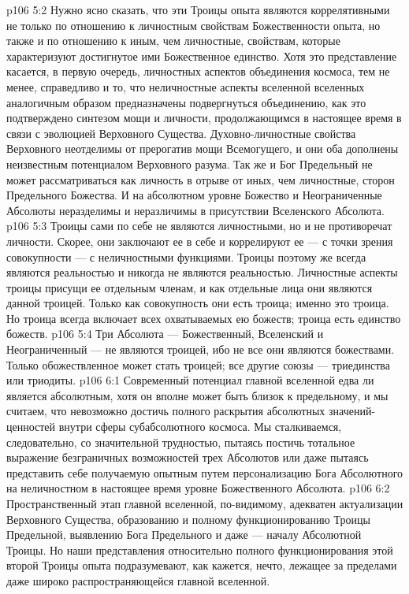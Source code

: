 \vs p106 5:2 Нужно ясно сказать, что эти Троицы опыта являются коррелятивными не только по отношению к личностным свойствам Божественности опыта, но также и по отношению к иным, чем личностные, свойствам, которые характеризуют достигнутое ими Божественное единство. Хотя это представление касается, в первую очередь, личностных аспектов объединения космоса, тем не менее, справедливо и то, что неличностные аспекты вселенной вселенных аналогичным образом предназначены подвергнуться объединению, как это подтверждено синтезом мощи и личности, продолжающимся в настоящее время в связи с эволюцией Верховного Существа. Духовно\hyp{}личностные свойства Верховного неотделимы от прерогатив мощи Всемогущего, и они оба дополнены неизвестным потенциалом Верховного разума. Так же и Бог Предельный не может рассматриваться как личность в отрыве от иных, чем личностные, сторон Предельного Божества. И на абсолютном уровне Божество и Неограниченные Абсолюты неразделимы и неразличимы в присутствии Вселенского Абсолюта.
\vs p106 5:3 Троицы сами по себе не являются личностными, но и не противоречат личности. Скорее, они заключают ее в себе и коррелируют ее --- с точки зрения совокупности --- с неличностными функциями. Троицы поэтому же всегда являются  реальностью и никогда не являются  реальностью. Личностные аспекты троицы присущи ее отдельным членам, и как отдельные лица они  являются данной троицей. Только как совокупность они есть троица; именно это  троица. Но троица всегда включает всех охватываемых ею божеств; троица есть единство божеств.
\vs p106 5:4 Три Абсолюта --- Божественный, Вселенский и Неограниченный --- не являются троицей, ибо не все они являются божествами. Только обожествленное может стать троицей; все другие союзы --- триединства или триодиты.
\vs p106 6:1 Современный потенциал главной вселенной едва ли является абсолютным, хотя он вполне может быть близок к предельному, и мы считаем, что невозможно достичь полного раскрытия абсолютных значений\hyp{}ценностей внутри сферы субабсолютного космоса. Мы сталкиваемся, следовательно, со значительной трудностью, пытаясь постичь тотальное выражение безграничных возможностей трех Абсолютов или даже пытаясь представить себе получаемую опытным путем персонализацию Бога Абсолютного на неличностном в настоящее время уровне Божественного Абсолюта.
\vs p106 6:2 Пространственный этап главной вселенной, по\hyp{}видимому, адекватен актуализации Верховного Существа, образованию и полному функционированию Троицы Предельной, выявлению Бога Предельного и даже --- началу Абсолютной Троицы. Но наши представления относительно полного функционирования этой второй Троицы опыта подразумевают, как кажется, нечто, лежащее за пределами даже широко распространяющейся главной вселенной.
